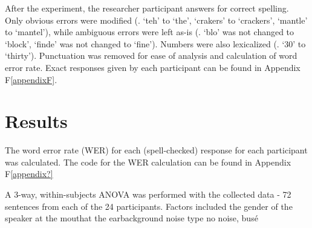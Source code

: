 After the experiment, the researcher \DIFdelbegin {}\DIFdelend \DIFaddbegin {}\DIFaddend participant answers for correct spelling.  Only obvious errors were modified (\DIFdelbegin {}\DIFdelend \DIFaddbegin {}\DIFaddend . `teh' to `the', `crakers' to `crackers', `mantle' to `mantel'), while ambiguous errors were left as-is (\DIFdelbegin {}\DIFdelend \DIFaddbegin {}\DIFaddend . `blo' was not changed to `block', `finde' was not changed to `fine').  Numbers were also lexicalized (\DIFdelbegin {}\DIFdelend \DIFaddbegin {}\DIFaddend . `30' to `thirty').  Punctuation was removed for ease of analysis and calculation of word error rate.  Exact responses given by each participant can be found in Appendix F\ref{appendixF}.


\section{Results}
\DIFdelbegin %
\DIFdelend \DIFaddbegin \label{chap3:results}
\DIFaddend 



The word error rate (WER) for each (spell-checked) response for each participant was calculated. The code for the WER calculation can be found in Appendix F\ref{appendix?}

A 3-way, within-subjects ANOVA was performed with the collected data - 72 sentences from each of the 24 participants. Factors included the gender \DIFaddbegin \DIFadd{(}\DIFaddend of the speaker \DIFdelbegin {}\DIFdelend \DIFaddbegin {}\DIFaddend at the mouth\DIFdelbegin {}\DIFdelend \DIFaddbegin \DIFadd{, }\DIFaddend at the ear\DIFdelbegin {}\DIFdelend \DIFaddbegin {}\DIFaddend background noise type \DIFdelbegin {}\DIFdelend \DIFaddbegin \DIFadd{(}\DIFaddend no noise, bus\DIFdelbegin {}\DIFdelend \DIFaddbegin {}\'{e}\textbf{}\textbf{}

